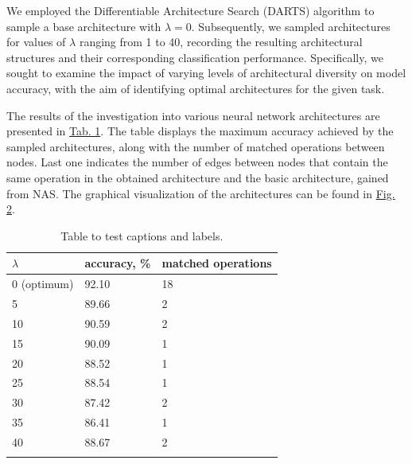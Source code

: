 \documentclass{article}
\begin{document}
We employed the Differentiable Architecture Search (DARTS) algorithm to sample a base architecture with $\lambda = 0$. Subsequently, we sampled architectures for values of $\lambda$ ranging from 1 to 40, recording the resulting architectural structures and their corresponding classification performance. Specifically, we sought to examine the impact of varying levels of architectural diversity on model accuracy, with the aim of identifying optimal architectures for the given task. 

The results of the investigation into various neural network architectures are presented in \hyperref[tab:prelim]{Tab. 1}.
The table displays the maximum accuracy achieved by the sampled architectures, along with the number of matched operations between nodes.
Last one indicates the number of edges between nodes that contain the same operation in the obtained architecture and the basic architecture, gained from NAS.
The graphical visualization of the architectures can be found in \hyperref[fig:graph1]{Fig. 2}.

\begin{table}[h   ]
	\centering
	\begin{tabular}{lll}
		\midrule
		$\lambda$     & accuracy, \% & matched operations \\
		\midrule
        0 (optimum) & 92.10 & 18 \\ 
        5  & 89.66 &  2   \\
		10  & 90.59   &  2   \\
		15 & 90.09   &  1   \\
		20 & 88.52   &  1   \\
      25 & 88.54   &  1   \\
      30 & 87.42   &  2   \\
      35 & 86.41   &  1   \\
      40 & 88.67   &  2  \\
      \hline
    \vspace{0.1cm}      
	\end{tabular}
    \caption{Table to test captions and labels.}
	\label{tab:prelim}
\end{table}
\end{document}
